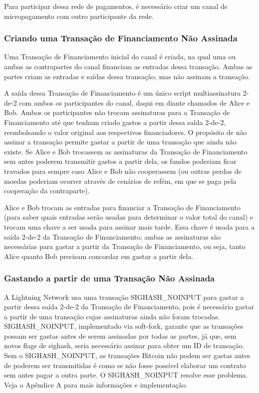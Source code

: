 \documentclass[letterpaper,11pt]{article}
\begin{document}
Para participar dessa rede de pagamentos, é necessário criar um canal de
micropagamento com outro participante da rede.

\subsubsection{Criando uma Transação de Financiamento Não Assinada}

Uma Transação de Financiamento inicial do canal é criada, na qual uma ou ambas
as contrapartes do canal financiam as entradas dessa transação. Ambas as
partes criam as entradas e saídas dessa transação, mas não assinam a
transação.

A saída dessa Transação de Financiamento é um único script multiassinatura
2-de-2 com ambos os participantes do canal, daqui em diante chamados de Alice
e Bob. Ambos os participantes não trocam assinaturas para a Transação de
Financiamento até que tenham criado gastos a partir dessa saída 2-de-2,
reembolsando o valor original aos respectivos financiadores. O propósito de
não assinar a transação permite gastar a partir de uma transação que ainda
não existe. Se Alice e Bob trocassem as assinaturas da Transação de
Financiamento sem antes poderem transmitir gastos a partir dela, os fundos
poderiam ficar travados para sempre caso Alice e Bob não cooperassem (ou
outras perdas de moedas poderiam ocorrer através de cenários de refém, em que
se paga pela cooperação da contraparte).

Alice e Bob trocam as entradas para financiar a Transação de Financiamento
(para saber quais entradas serão usadas para determinar o valor total do
canal) e trocam uma chave a ser usada para assinar mais tarde. Essa chave é
usada para a saída 2-de-2 da Transação de Financiamento; ambas as assinaturas
são necessárias para gastar a partir da Transação de Financiamento, ou seja,
tanto Alice quanto Bob precisam concordar em gastar a partir dela.

\subsubsection{Gastando a partir de uma Transação Não Assinada}

A Lightning Network usa uma transação SIGHASH\_NOINPUT para gastar a partir
dessa saída 2-de-2 da Transação de Financiamento, pois é necessário gastar a
partir de uma transação cujas assinaturas ainda não foram trocadas.
SIGHASH\_NOINPUT, implementado via soft-fork, garante que as transações possam
ser gastas antes de serem assinadas por todas as partes, já que, sem novos
flags de sighash, seria necessário assinar para obter um ID de transação.
Sem o SIGHASH\_NOINPUT, as transações Bitcoin não podem ser gastas antes de
poderem ser transmitidas \textemdash é como se não fosse possível elaborar um
contrato sem antes pagar a outra parte. O SIGHASH\_NOINPUT resolve esse
problema. Veja o Apêndice A para mais informações e implementação.
\end{document}
